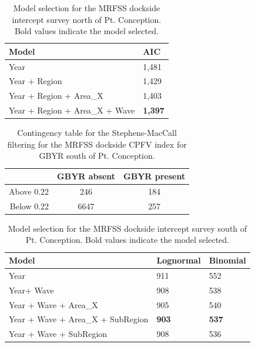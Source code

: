 \documentclass[12pt,]{article}
\begin{document}
\vspace{3cm}

\vspace{3cm}

\begin{table}[!h]
\centering
\caption{Model selection for the MRFSS dockside intercept survey 
                                        north of Pt. Conception. Bold 
                                        values indicate the model selected.} 
\label{tab:Fleet10_AIC}
\begin{tabular}{ll}
  \hline
Model & AIC \\ 
  \hline
Year & 1,481 \\ 
  Year + Region & 1,429 \\ 
  Year + Region + Area\_X & 1,403 \\ 
  Year + Region + Area\_X + Wave & \textbf{1,397} \\ 
   \hline
\end{tabular}
\end{table}

\vspace{3cm}

\begin{table}[!h]
\centering
\caption{Contingency table for the Stephens-MacCall 
                                            filtering for the MRFSS dockside CPFV index 
                                            for GBYR south of Pt. Conception.} 
\label{tab:Fleet11_contingency}
\begin{tabular}{rcc}
  \hline
  & GBYR absent & GBYR present \\ 
  \hline
Above 0.22 & 246 & 184 \\ 
  Below 0.22 & 6647 & 257 \\ 
   \hline
\end{tabular}
\end{table}

\vspace{3cm}

\vspace{3cm}

\begin{table}[!h]
\centering
\caption{Model selection for the MRFSS dockside intercept 
                                        survey south of Pt. Conception. Bold 
                                        values indicate the model selected.} 
\label{tab:Fleet11_AIC}
\begin{tabular}{lll}
  \hline
Model & Lognormal & Binomial \\ 
  \hline
Year & 911 & 552 \\ 
  Year+ Wave & 908 & 538 \\ 
  Year + Wave + Area\_X & 905 & 540 \\ 
  Year + Wave + Area\_X + SubRegion & \textbf{903} & \textbf{537} \\ 
  Year + Wave + SubRegion & 908 & 536 \\ 
   \hline
\end{tabular}
\end{table}
\end{document}
